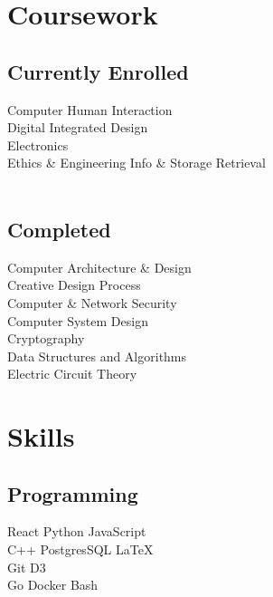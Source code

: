 \documentclass[letterpaper]{deedy-resume} %
\begin{document}
\begin{minipage}[t]{0.33\textwidth}
\section{Coursework} 
\subsection{Currently Enrolled}

Computer Human Interaction \\
Digital Integrated Design \\
Electronics \\ 
Ethics \& Engineering
Info \& Storage Retrieval \\ \ \\

\subsection{Completed}
Computer Architecture \& Design \\
Creative Design Process \\
Computer \& Network Security \\
Computer System Design \\
Cryptography \\
Data Structures and Algorithms \\
Electric Circuit Theory \\

\sectionspace %


\section{Skills}

\subsection{Programming}

\textbullet{} React \textbullet{} Python \textbullet{} JavaScript \\
\textbullet{} C++ \textbullet{} PostgresSQL \textbullet{} \LaTeX\ \\
\textbullet{} Git \textbullet{} D3 \\
\textbullet{} Go  \textbullet{} Docker \textbullet{} Bash


\end{minipage}
\end{document}
